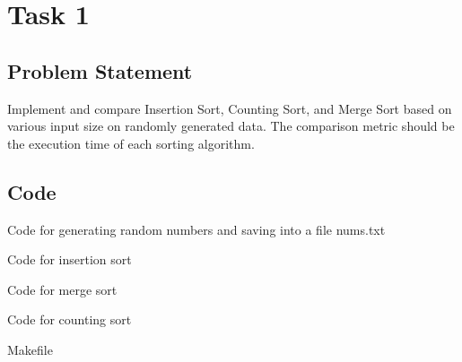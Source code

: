 \section{Task 1}
\subsection{Problem Statement}
Implement and compare Insertion Sort, Counting Sort, and Merge Sort based on
various input size on randomly generated data.  The comparison metric should be
the execution time of each sorting algorithm.
\subsection{Code}
\begin{code}
    \caption{Code for generating random numbers and saving into a file nums.txt}
    \label{code:random}
\end{code}

\begin{code}
    \caption{Code for insertion sort}
    \label{code:insertion}
\end{code}

\begin{code}
    \caption{Code for merge sort}
    \label{code:merge}
\end{code}

\begin{code}
    \caption{Code for counting sort}
    \label{code:counting}
\end{code}

\begin{code}
    \caption{Makefile}
    \inputminted[fontsize=\small]{make}{../Makefile}
\end{code}


